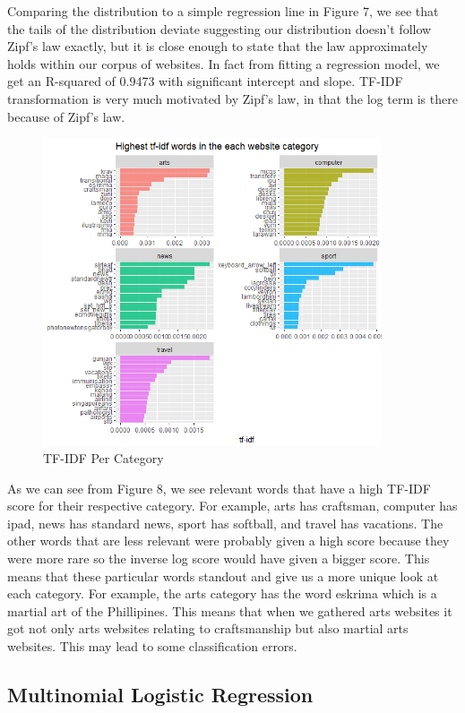 \documentclass[12pt]{article}
\begin{document}
Comparing the distribution to a simple regression line in Figure 7, we see that the tails of the distribution deviate suggesting our distribution doesn’t follow Zipf’s law exactly, but it is close enough to state that the law approximately holds within our corpus of websites. In fact from fitting a regression model, we get an R-squared of 0.9473 with significant intercept and slope. TF-IDF transformation is very much motivated by Zipf's law, in that the log term is there because of Zipf's law. 


\begin{figure}[ht!]
\includegraphics[width=100mm]{tfidf.png}
    \caption{TF-IDF Per Category}
\end{figure}

As we can see from Figure 8, we see relevant words that have a high TF-IDF score for their respective category. For example, arts has craftsman, computer has ipad, news has standard news, sport has softball, and travel has vacations. The other words that are less relevant were probably given a high score because they were more rare so the inverse log score would have given a bigger score. This means that these particular words standout and give us a more unique look at each category. For example, the arts category has the word eskrima which is a martial art of the Phillipines. This means that when we gathered arts websites it got not only arts websites relating to craftsmanship but also martial arts websites. This may lead to some classification errors.

\begin{center}
\subsection{Multinomial Logistic Regression}
\end{center}
\end{document}
